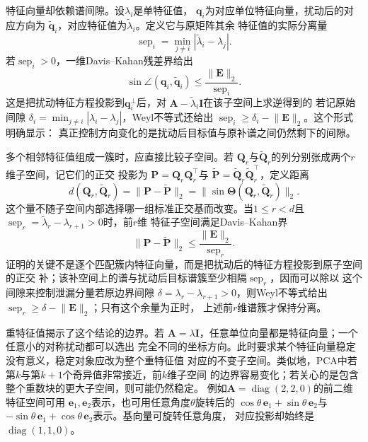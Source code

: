 特征向量却依赖谱间隙。设$\lambda_i$是单特征值，
$\bm{q}_i$为对应单位特征向量，扰动后的对应方向为
$\widetilde{\bm{q}}_i$，对应特征值为$\widetilde{\lambda}_i$。定义它与原矩阵其余
特征值的实际分离量
\[
  \operatorname{sep}_i
  =
  \min_{j\neq i}|\widetilde{\lambda}_i-\lambda_j|.
\]
若$\operatorname{sep}_i>0$，一维Davis--Kahan残差界给出
\begin{equation}
  \sin\angle(\bm{q}_i,\widetilde{\bm{q}}_i)
  \leq
  \frac{\lVert\bm{E}\rVert_2}{\operatorname{sep}_i}.
  \label{eq:matrix-analysis-eigenvector-gap-bound}
\end{equation}
这是把扰动特征方程投影到$\bm{q}_i^{\perp}$后，对
$\bm{A}-\widetilde{\lambda}_i\bm{I}$在该子空间上求逆得到的
若记原始间隙
$\delta_i=\min_{j\neq i}|\lambda_i-\lambda_j|$，Weyl不等式还给出
$\operatorname{sep}_i\geq\delta_i-\lVert\bm{E}\rVert_2$。这个形式明确显示：
真正控制方向变化的是扰动后目标值与原补谱之间仍然剩下的间隙。

多个相邻特征值组成一簇时，应直接比较子空间。若
$\bm{Q}_r$与$\widetilde{\bm{Q}}_r$的列分别张成两个$r$维子空间，记它们的正交
投影为
$\bm{P}=\bm{Q}_r\bm{Q}_r^{\top}$与
$\widetilde{\bm{P}}
=\widetilde{\bm{Q}}_r\widetilde{\bm{Q}}_r^{\top}$，定义距离
\[
  d(\bm{Q}_r,\widetilde{\bm{Q}}_r)
  =\lVert\bm{P}-\widetilde{\bm{P}}\rVert_2
  =\lVert\sin\bm{\Theta}(\bm{Q}_r,\widetilde{\bm{Q}}_r)\rVert_2.
\]
这个量不随子空间内部选择哪一组标准正交基而改变。当$1\leq r<d$且
$\operatorname{sep}_r=\widetilde{\lambda}_r-\lambda_{r+1}>0$时，前$r$维
特征子空间满足Davis--Kahan界
\[
  \lVert\bm{P}-\widetilde{\bm{P}}\rVert_2
  \leq\frac{\lVert\bm{E}\rVert_2}{\operatorname{sep}_r}.
\]
证明的关键不是逐个匹配簇内特征向量，而是把扰动后的特征方程投影到原子空间的正交
补；该补空间上的谱与扰动后目标谱簇至少相隔$\operatorname{sep}_r$，因而可以除以
这个间隙来控制泄漏分量若原边界间隙
$\delta=\lambda_r-\lambda_{r+1}>0$，则Weyl不等式给出
$\operatorname{sep}_r\geq\delta-\lVert\bm{E}\rVert_2$；只有这个余量为正时，
上述前$r$维谱簇才保持分离。

重特征值揭示了这个结论的边界。若
$\bm{A}=\lambda\bm{I}$，任意单位向量都是特征向量；一个任意小的对称扰动都可以选出
完全不同的坐标方向。此时要求某个特征向量稳定没有意义，稳定对象应改为整个重特征值
对应的不变子空间。类似地，PCA中若第$k$与第$k+1$个奇异值非常接近，前$k$维子空间
的边界容易变化；若关心的是包含整个重数块的更大子空间，则可能仍然稳定。
例如$\bm{A}=\operatorname{diag}(2,2,0)$的前二维特征空间可用
$\bm{e}_1,\bm{e}_2$表示，也可用任意角度$\theta$旋转后的
$\cos\theta\,\bm{e}_1+\sin\theta\,\bm{e}_2$与
$-\sin\theta\,\bm{e}_1+\cos\theta\,\bm{e}_2$表示。基向量可旋转任意角度，
对应投影却始终是$\operatorname{diag}(1,1,0)$。

